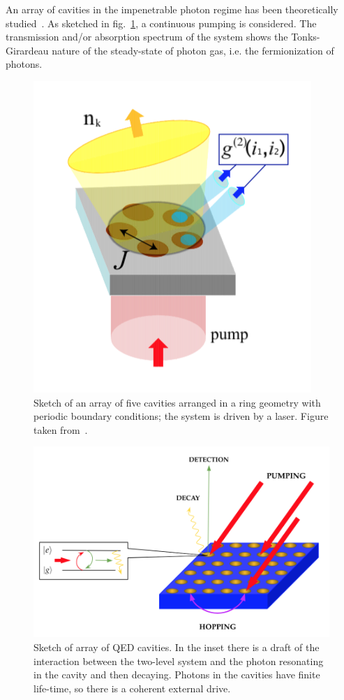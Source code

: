An array of cavities in the impenetrable photon regime has been theoretically studied~\cite{carusotto_ciuti}. As sketched in fig.~\ref{fig:cavities_ring}, a continuous pumping is considered. The transmission and/or absorption spectrum of the system shows the Tonks-Girardeau nature of the steady-state of photon gas, i.e. the fermionization of photons.

\begin{figure}
    \centering
    \includegraphics[scale=0.7]{Figures/cavities_ring.png}
    \caption{Sketch of an array of five cavities arranged in a ring geometry with periodic boundary conditions; the system is driven by a laser. Figure taken from~\cite{carusotto_ciuti}.}
    \label{fig:cavities_ring}
\end{figure}


\begin{figure}
    \centering
    \includegraphics[scale=0.7]{Figures/QED_cavity.png}
    \caption{Sketch of array of QED cavities. In the inset there is a draft of the interaction between the two-level system and the photon resonating in the cavity and then decaying. Photons in the cavities have finite life-time, so there is a coherent external drive.}
    \label{fig:QED_cavities}
\end{figure}

